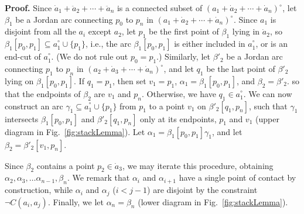 \documentclass{article}
\newcommand{\ti}[2][]{{#2}^{\circ_{#1}}}
\newcommand{\intermediate}[1]{\dot{#1}}
\newcommand{\inner}[1]{\ddot{#1}}
\newcommand{\qedsymbol}{\ding{113}}
\newenvironment{proof}{\par\noindent\textbf{Proof.}}{\mbox{}\hfill\qedsymbol\par\bigskip}
\begin{document}
\begin{proof}
Since $\intermediate{a}_1 + \inner{a}_2 + \cdots + \inner{a}_n$ is a
connected subset of $\ti{(a_1 + \intermediate{a}_2 + \cdots +
  \intermediate{a}_n)}$, let $\beta_1$ be a Jordan arc connecting
$p_0$ to $p_n$ in $\ti{(a_1 + \intermediate{a}_2 + \cdots +
  \intermediate{a}_n)}$. Since $a_1$ is disjoint from all the $a_i$
except $a_2$, let $p_1$ be the first point of $\beta_1$ lying in
$\intermediate{a}_2$, so $\beta_1[p_0,p_1]\subseteq \ti{a}_1\cup \{
p_1\}$, i.e., the arc $\beta_1[p_0,p_1]$ is either included in
$\ti{a}_1$, or is an end-cut of $\ti{a}_1$. (We do not rule out $p_0 =
p_1$.) Similarly, let $\beta'_2$ be a Jordan arc connecting $p_1$ to
$p_n$ in $\ti{(a_2 + \intermediate{a}_3 + \cdots +
  \intermediate{a}_n)}$, and let $q_1$ be the last point of $\beta'_2$
lying on $\beta_1[p_0,p_1]$. If $q_1 = p_1$, then set $v_1 = p_1$,
$\alpha_1 = \beta_1[p_0,p_1]$, and $\beta_2 = \beta'_2$.  so that the
endpoints of $\beta_2$ are $v_1$ and $p_n$.  Otherwise, we have $q_1
\in \ti{a}_1$.  We can now construct an arc $\gamma_1 \subseteq
\ti{a}_1 \cup \{ p_1 \}$ from $p_1$ to a point $v_1$ on
$\beta'_2[q_1,p_n]$, such that $\gamma_1$ intersects
$\beta_1[p_0,p_1]$ and $\beta'_2[q_1,p_n]$ only at its endpoints,
$p_1$ and $v_1$ (upper diagram in Fig.~\ref{fig:stackLemma}). Let
$\alpha_1 = \beta_1[p_0,p_1]\gamma_1$, and let $\beta_2 =
\beta'_2[v_1,p_n]$.

Since $\beta_2$ contains a point $p_2 \in \intermediate{a}_3$, we may
iterate this procedure, obtaining $\alpha_2, \alpha_3, \ldots
\alpha_{n-1}, \beta_{n}$. We remark that $\alpha_i$ and $\alpha_{i+1}$
have a single point of contact by construction, while $\alpha_i$ and
$\alpha_j$ ($i < j-1$) are disjoint by the constraint $\neg C(a_i,
a_j)$.  Finally, we let $\alpha_n = \beta_n$ (lower diagram in
Fig.~\ref{fig:stackLemma}).
\end{proof}
\end{document}
